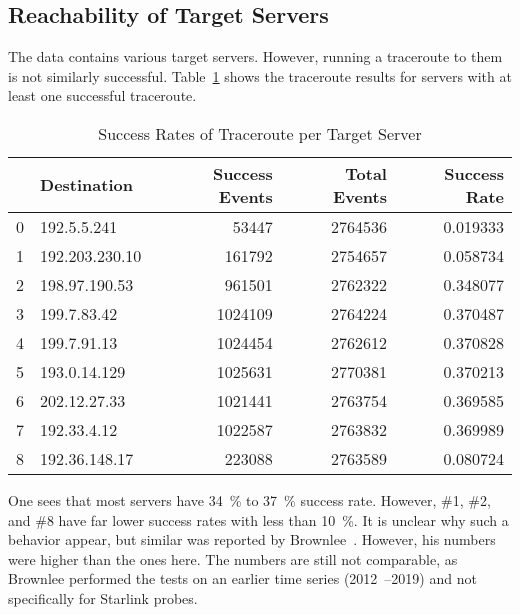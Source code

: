 
\subsection{Reachability of Target Servers}

The data contains various target servers. However, running a traceroute to them
is not similarly successful. Table~\ref{fig:traceroute-success-rates} shows the
traceroute results for servers with at least one successful traceroute.

\begin{table}
	\footnotesize
	\caption{Success Rates of Traceroute per Target Server}
	\label{fig:traceroute-success-rates}
	\begin{tabular}{llrrr}
		\toprule
		  & Destination    & Success Events & Total Events & Success Rate \\
		\midrule
		0 & 192.5.5.241    & 53447          & 2764536      & 0.019333     \\
		1 & 192.203.230.10 & 161792         & 2754657      & 0.058734     \\
		2 & 198.97.190.53  & 961501         & 2762322      & 0.348077     \\
		3 & 199.7.83.42    & 1024109        & 2764224      & 0.370487     \\
		4 & 199.7.91.13    & 1024454        & 2762612      & 0.370828     \\
		5 & 193.0.14.129   & 1025631        & 2770381      & 0.370213     \\
		6 & 202.12.27.33   & 1021441        & 2763754      & 0.369585     \\
		7 & 192.33.4.12    & 1022587        & 2763832      & 0.369989     \\
		8 & 192.36.148.17  & 223088         & 2763589      & 0.080724     \\
		\bottomrule
	\end{tabular}
\end{table}

One sees that most servers have 34~\% to 37~\% success rate. However, \#1, \#2,
and \#8 have far lower success rates with less than 10~\%. It is unclear why
such a behavior appear, but similar was reported by
Brownlee~\cite{Brownlee2021}. However, his numbers were higher than the ones
here. The numbers are still not comparable, as Brownlee performed the tests on
an earlier time series (2012~--2019) and not specifically for Starlink probes.

